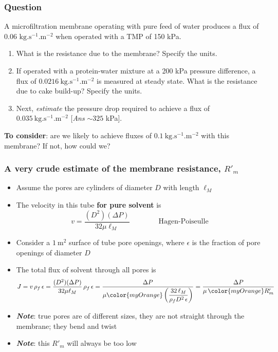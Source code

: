 \begin{frame}\frametitle{Question}
	A microfiltration membrane operating with pure feed of water produces a flux of 0.06 $\text{kg}.\text{s}^{-1}\text{.m}^{-2}$ when operated with a TMP of 150 kPa.

	\begin{enumerate}
		\item	What is the resistance due to the membrane? Specify the units.
		\item	If operated with a protein-water mixture at a 200 kPa pressure difference, a flux of $0.0216~\text{kg}.\text{s}^{-1}\text{.m}^{-2}$ is measured at steady state. What is the resistance due to cake build-up? Specify the units.
		\item	Next, \emph{estimate} the pressure drop required to achieve a flux of $0.035~\text{kg}.\text{s}^{-1}\text{.m}^{-2}$ {\color{myOrange} \scriptsize [\emph{Ans} $\sim 325$ kPa]}.
	\end{enumerate}
	\textbf{To consider}: are we likely to achieve fluxes of $0.1~\text{kg}.\text{s}^{-1}\text{.m}^{-2}$ with this membrane? If not, how could we?
	
	
\end{frame}

\begin{frame}\frametitle{A \textbf{very crude} estimate of the membrane resistance, $R'_m$}
	\begin{itemize}
		\item	Assume the pores are cylinders of diameter $D$ with length $\ell_M$
		\item	The velocity in this tube \textbf{for pure solvent} is \[v = \dfrac{(D^2)(\Delta P)}{32 \mu \ell_M} \qquad \qquad \text{Hagen-Poiseulle}\]
		\item	Consider a $1~\text{m}^2$ surface of tube pore openings, where $\epsilon$ is the fraction of pore openings of diameter $D$
		\item	The total flux of solvent through all pores is \[J = v\, \rho_f\, \epsilon = \dfrac{(D^2)(\Delta P)}{32 \mu \ell_M}\, \rho_f\, \epsilon = \dfrac{\Delta P}{\mu {\color{myOrange}\left(\dfrac{32 \,\ell_M}{\rho_f D^2 \,\epsilon } \right)}} = \dfrac{\Delta P}{\mu \, {\color{myOrange}R'_m}}\] %
		\item	\emph{\textbf{Note}}: true pores are of different sizes, they are not straight through the membrane; they bend and twist
		\item	\emph{\textbf{Note}}: this $R'_m$ will always be too low 
	\end{itemize}
\end{frame}

